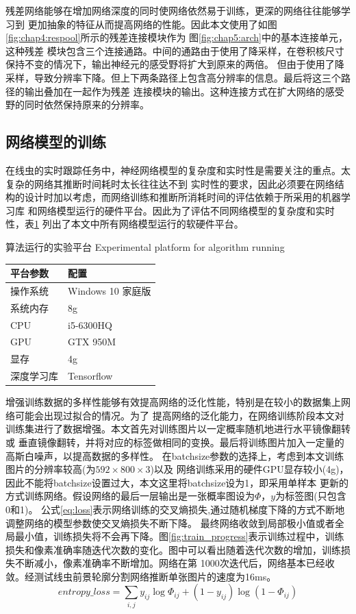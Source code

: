 	残差网络\cite{he2016deep}能够在增加网络深度的同时使网络依然易于训练，更深的网络往往能够学习到
	更加抽象的特征从而提高网络的性能。因此本文使用了如图\ref{fig:chap4:respool}所示的残差连接模块\cite{chu2017multi}作为
	图\ref{fig:chap5:arch}中的基本连接单元，这种残差
	模块包含三个连接通路。中间的通路由于使用了降采样，在卷积核尺寸保持不变的情况下，输出神经元的感受野将扩大到原来的两倍。
	但由于使用了降采样，导致分辨率下降。但上下两条路径上包含高分辨率的信息。最后将这三个路径的输出叠加在一起作为残差
	连接模块的输出。这种连接方式在扩大网络的感受野的同时依然保持原来的分辨率。
	
\subsection{网络模型的训练}
	在线虫的实时跟踪任务中，神经网络模型的复杂度和实时性是需要关注的重点。太复杂的网络其推断时间耗时太长往往达不到
	实时性的要求，因此必须要在网络结构的设计时加以考虑，而网络训练和推断所消耗时间的评估依赖于所采用的机器学习库
	和网络模型运行的硬件平台。因此为了评估不同网络模型的复杂度和实时性，表\ref{tab:hardwareconfig}
	列出了本文中所有网络模型运行的软硬件平台。
	\begin{table}[!hpb]
	\centering
	\bicaption
    {算法运行的实验平台}
    {Experimental platform for algorithm running}
	\label{tab:hardwareconfig}
	\begin{tabular}{p{80pt}p{100pt}}
	\toprule
	平台参数 & 配置 \\
	\midrule
	操作系统 & Windows 10 家庭版\\
	系统内存 & 8g \\
	CPU & i5-6300HQ \\
	GPU & GTX 950M \\
	显存 & 4g \\
	深度学习库 & Tensorflow \\
	\bottomrule
	\end{tabular}
	\end{table}
	
	增强训练数据的多样性能够有效提高网络的泛化性能，特别是在较小的数据集上网络可能会出现过拟合的情况。为了
	提高网络的泛化能力，在网络训练阶段本文对训练集进行了数据增强。本文首先对训练图片以一定概率随机地进行水平镜像翻转或
	垂直镜像翻转，并将对应的标签做相同的变换。最后将训练图片加入一定量的高斯白噪声，以提高数据的多样性。
	在batchsize参数的选择上，考虑到本文训练图片的分辨率较高(为$592\times800\times3$)以及
	网络训练采用的硬件GPU显存较小(4g)，因此不能将batchsize设置过大，本文这里将batchsize设为1，即采用单样本
	更新的方式训练网络。假设网络的最后一层输出是一张概率图设为$\Phi$，$y$为标签图(只包含0和1)。
	公式\ref{eq:loss}表示网络训练的交叉熵损失,通过随机梯度下降的方式不断地调整网络的模型参数使交叉熵损失不断下降。
	最终网络收敛到局部极小值或者全局最小值，训练损失将不会再下降。图\ref{fig:train_progress}表示训练过程中，训练
	损失和像素准确率随迭代次数的变化。图中可以看出随着迭代次数的增加，训练损失不断减小，像素准确率不断增加。网络在第
	1000次迭代后，网络基本已经收敛。经测试线虫前景轮廓分割网络推断单张图片的速度为16ms。
	\begin{equation}
		entropy\_loss = \sum_{i,j}y_{ij}\log \Phi_{ij} + (1-y_{ij})\log (1-\Phi_{ij}) \label{eq:loss}
	\end{equation}
	

